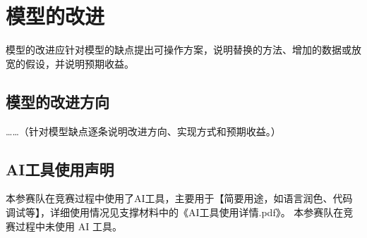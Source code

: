 
\section{模型的改进}

模型的改进应针对模型的缺点提出可操作方案，说明替换的方法、增加的数据或放宽的假设，并说明预期收益。

\subsection{模型的改进方向}

……（针对模型缺点逐条说明改进方向、实现方式和预期收益。）

\subsection*{AI工具使用声明}

\ifaiused
本参赛队在竞赛过程中使用了AI工具，主要用于【简要用途，如语言润色、代码调试等】，详细使用情况见支撑材料中的《AI工具使用详情.pdf》。
\else
本参赛队在竞赛过程中未使用 AI 工具。
\fi
